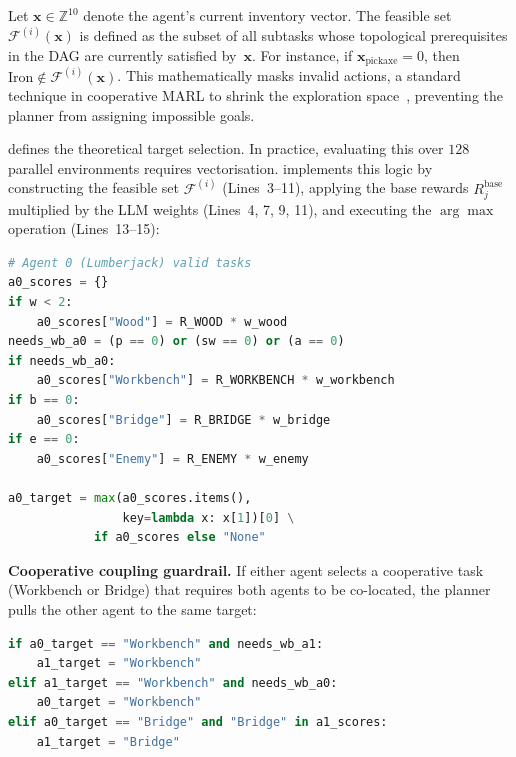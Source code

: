 Let $\mathbf{x} \in \mathbb{Z}^{10}$ denote the agent's current
inventory vector.
The feasible set $\mathcal{F}^{(i)}(\mathbf{x})$ is defined as the
subset of all subtasks whose topological prerequisites in the DAG are
currently satisfied by~$\mathbf{x}$.
For instance, if $\mathbf{x}_{\text{pickaxe}} = 0$, then
$\text{Iron} \notin \mathcal{F}^{(i)}(\mathbf{x})$.
This mathematically masks invalid actions, a standard technique in cooperative MARL to shrink the exploration space~\parencite{Albrecht_Christianos_Schäfer_2024}, preventing the planner from
assigning impossible goals.

 defines the theoretical target selection.
In practice, evaluating this over $128$ parallel environments requires
vectorisation.
 implements this logic by constructing the
feasible set $\mathcal{F}^{(i)}$ (Lines~3--11), applying the base
rewards $R_j^{\text{base}}$ multiplied by the LLM weights
(Lines~4, 7, 9, 11), and executing the $\arg\max$ operation
(Lines~13--15):
\begin{lstlisting}[style=code, language=Python, caption={Greedy score computation for Agent~0 in \texttt{orchestrator.py}.}, label={lst:greedy_planner}]
# Agent 0 (Lumberjack) valid tasks
a0_scores = {}
if w < 2:
    a0_scores["Wood"] = R_WOOD * w_wood
needs_wb_a0 = (p == 0) or (sw == 0) or (a == 0)
if needs_wb_a0:
    a0_scores["Workbench"] = R_WORKBENCH * w_workbench
if b == 0:
    a0_scores["Bridge"] = R_BRIDGE * w_bridge
if e == 0:
    a0_scores["Enemy"] = R_ENEMY * w_enemy

a0_target = max(a0_scores.items(),
                key=lambda x: x[1])[0] \
            if a0_scores else "None"
\end{lstlisting}

\noindent
\textbf{Cooperative coupling guardrail.}
If either agent selects a cooperative task (Workbench or Bridge) that
requires both agents to be co-located, the planner pulls the
other agent to the same target:
\begin{lstlisting}[style=code, language=Python, caption={Cooperative coupling in \texttt{orchestrator.py}.}, label={lst:coop_coupling}]
if a0_target == "Workbench" and needs_wb_a1:
    a1_target = "Workbench"
elif a1_target == "Workbench" and needs_wb_a0:
    a0_target = "Workbench"
elif a0_target == "Bridge" and "Bridge" in a1_scores:
    a1_target = "Bridge"
\end{lstlisting}

